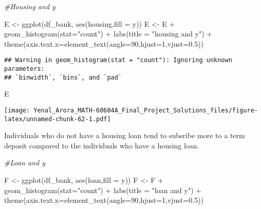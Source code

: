 \documentclass[
]{article}
\newenvironment{Shaded}{\begin{snugshade}}{\end{snugshade}}
\newcommand{\AttributeTok}[1]{\textcolor[rgb]{0.77,0.63,0.00}{#1}}
\newcommand{\CommentTok}[1]{\textcolor[rgb]{0.56,0.35,0.01}{\textit{#1}}}
\newcommand{\DecValTok}[1]{\textcolor[rgb]{0.00,0.00,0.81}{#1}}
\newcommand{\FloatTok}[1]{\textcolor[rgb]{0.00,0.00,0.81}{#1}}
\newcommand{\FunctionTok}[1]{\textcolor[rgb]{0.00,0.00,0.00}{#1}}
\newcommand{\NormalTok}[1]{#1}
\newcommand{\OtherTok}[1]{\textcolor[rgb]{0.56,0.35,0.01}{#1}}
\newcommand{\SpecialCharTok}[1]{\textcolor[rgb]{0.00,0.00,0.00}{#1}}
\newcommand{\StringTok}[1]{\textcolor[rgb]{0.31,0.60,0.02}{#1}}
\begin{document}
\begin{Shaded}
\begin{Highlighting}[]
\CommentTok{\#Housing and y}

\NormalTok{E }\OtherTok{\textless{}{-}} \FunctionTok{ggplot}\NormalTok{(df\_bank, }\FunctionTok{aes}\NormalTok{(housing,}\AttributeTok{fill =}\NormalTok{ y))}
\NormalTok{E }\OtherTok{\textless{}{-}}\NormalTok{ E }\SpecialCharTok{+} \FunctionTok{geom\_histogram}\NormalTok{(}\AttributeTok{stat=}\StringTok{"count"}\NormalTok{) }\SpecialCharTok{+} \FunctionTok{labs}\NormalTok{(}\AttributeTok{title =} \StringTok{"housing and y"}\NormalTok{) }\SpecialCharTok{+}
  \FunctionTok{theme}\NormalTok{(}\AttributeTok{axis.text.x=}\FunctionTok{element\_text}\NormalTok{(}\AttributeTok{angle=}\DecValTok{90}\NormalTok{,}\AttributeTok{hjust=}\DecValTok{1}\NormalTok{,}\AttributeTok{vjust=}\FloatTok{0.5}\NormalTok{))}
\end{Highlighting}
\end{Shaded}

\begin{verbatim}
## Warning in geom_histogram(stat = "count"): Ignoring unknown parameters:
## `binwidth`, `bins`, and `pad`
\end{verbatim}

\begin{Shaded}
\begin{Highlighting}[]
\NormalTok{E}
\end{Highlighting}
\end{Shaded}

\texttt{[image: Yenal\_Arora\_MATH-60604A\_Final\_Project\_Solutions\_files/figure-latex/unnamed-chunk-62-1.pdf]}

Individuals who do not have a housing loan tend to subsribe more to a
term deposit compared to the individuals who have a housing loan.

\begin{Shaded}
\begin{Highlighting}[]
\CommentTok{\#Loan and y}

\NormalTok{F }\OtherTok{\textless{}{-}} \FunctionTok{ggplot}\NormalTok{(df\_bank, }\FunctionTok{aes}\NormalTok{(loan,}\AttributeTok{fill =}\NormalTok{ y))}
\NormalTok{F }\OtherTok{\textless{}{-}}\NormalTok{ F }\SpecialCharTok{+} \FunctionTok{geom\_histogram}\NormalTok{(}\AttributeTok{stat=}\StringTok{"count"}\NormalTok{) }\SpecialCharTok{+} \FunctionTok{labs}\NormalTok{(}\AttributeTok{title =} \StringTok{"loan and y"}\NormalTok{) }\SpecialCharTok{+}
  \FunctionTok{theme}\NormalTok{(}\AttributeTok{axis.text.x=}\FunctionTok{element\_text}\NormalTok{(}\AttributeTok{angle=}\DecValTok{90}\NormalTok{,}\AttributeTok{hjust=}\DecValTok{1}\NormalTok{,}\AttributeTok{vjust=}\FloatTok{0.5}\NormalTok{))}
\end{Highlighting}
\end{Shaded}
\end{document}
